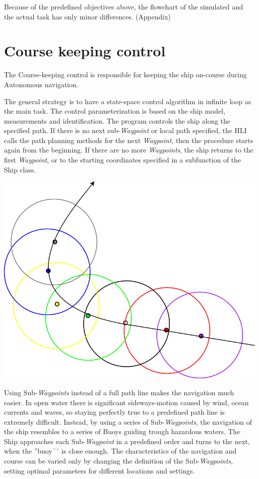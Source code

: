 Because of the predefined objectives above, the flowchart of the simulated and the actual task has only minor differences. (Appendix)

\section{Course keeping control}

The Course-keeping control is responsible for keeping the ship on-course during Autonomous navigation.

The general strategy is to have a state-space control algorithm in infinite loop as the main task. The control parameterization is based on the ship model, measurements and identification.
The program controls the ship along the specified path. If there is no next sub-\emph{Waypoint} or local path specified, the HLI calls the path planning methods for the next \emph{Waypoint}, then the procedure starts again from the beginning. If there are no more \emph{Waypoints}, the ship returns to the first \emph{Waypoint}, or to the starting coordinates specified in a subfunction of the Ship class.

\includegraphics[width = \textwidth]{img/HLIFigures/SWPNavigationConcept.png}

Using Sub-\emph{Waypoints} instead of a full path line makes the navigation much easier. In open water there is significant sideways-motion caused by wind, ocean currents and waves, so staying perfectly true to a predefined path line is extremely difficult.
Instead, by using a series of Sub-\emph{Waypoints}, the navigation of the ship resembles to a series of Buoys guiding trough hazardous waters. The Ship approaches each Sub-\emph{Waypoint} in a predefined order and turns to the next, when the ''buoy´´ is close enough.
The characteristics of the navigation and course can be varied only by changing the definition of the Sub-\emph{Waypoints}, setting optimal parameters for different locations and settings.

